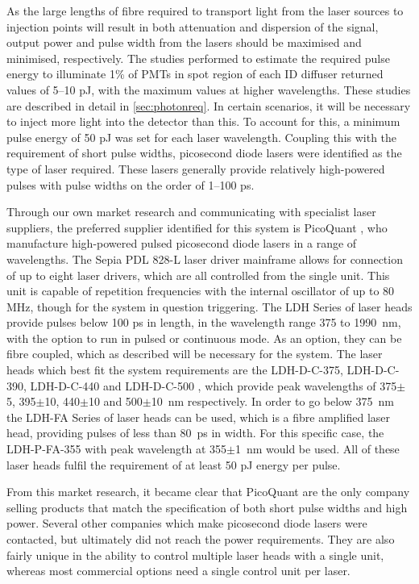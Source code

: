 \documentclass[a4paper,11pt]{article}
\begin{document}
As the large lengths of fibre required to transport light from the laser sources to injection points will result in both attenuation and dispersion of the signal, output power and pulse width from the lasers should be maximised and minimised, respectively. The studies performed to estimate the required pulse energy to illuminate 1\% of PMTs in spot region of each ID diffuser returned values of 5--10 pJ, with the maximum values at higher wavelengths. These studies are described in detail in \cref{sec:photonreq}. In certain scenarios, it will be necessary to inject more light into the detector than this. To account for this, a minimum pulse energy of 50 pJ was set for each laser wavelength. Coupling this with the requirement of short pulse widths, picosecond diode lasers were identified as the type of laser required. These lasers generally provide relatively high-powered pulses with pulse widths on the order of 1--100 ps.

Through our own market research and communicating with specialist laser suppliers, the preferred supplier identified for this system is PicoQuant \cite{bib:picoquant}, who manufacture high-powered pulsed picosecond diode lasers in a range of wavelengths. The Sepia PDL 828-L laser driver mainframe \cite{bib:laserdriver} allows for connection of up to eight laser drivers, which are all controlled from the single unit. This unit is capable of repetition frequencies with the internal oscillator of up to 80 MHz, though for the system in question triggering. The LDH Series of laser heads \cite{bib:laserhead} provide pulses below 100 ps in length, in the wavelength range 375 to 1990~nm, with the option to run in pulsed or continuous mode. As an option, they can be fibre coupled, which as described will be necessary for the system. The laser heads which best fit the system requirements are the LDH-D-C-375, LDH-D-C-390, LDH-D-C-440 and LDH-D-C-500 \cite{bib:picoquant}, which provide peak wavelengths of 375$\pm$5, 395$\pm$10, 440$\pm$10 and 500$\pm$10~nm respectively. In order to go below 375~nm the LDH-FA Series of laser heads \cite{bib:LDH} can be used, which is a fibre amplified laser head, providing pulses of less than 80~ps in width. For this specific case, the LDH-P-FA-355 with peak wavelength at 355$\pm$1~nm would be used. All of these laser heads fulfil the requirement of at least 50 pJ energy per pulse.

From this market research, it became clear that PicoQuant are the only company selling products that match the specification of both short pulse widths and high power. Several other companies which make picosecond diode lasers were contacted, but ultimately did not reach the power requirements. They are also fairly unique in the ability to control multiple laser heads with a single unit, whereas most commercial options need a single control unit per laser.
\end{document}
